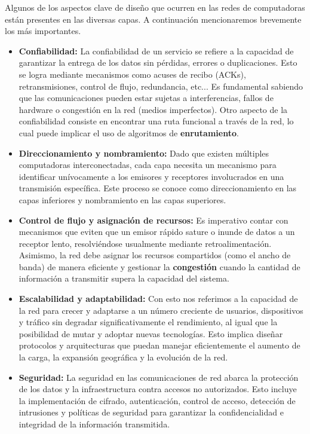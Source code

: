 Algunos de los aspectos clave de diseño que ocurren en las redes de computadoras están presentes en las diversas capas. A continuación mencionaremos brevemente los más importantes.

\begin{itemize}
  \item \textbf{Confiabilidad:} La confiabilidad de un servicio se refiere a la capacidad de garantizar la entrega de los datos sin pérdidas, errores o duplicaciones. Esto se logra mediante mecanismos como acuses de recibo (ACKs), retransmisiones, control de flujo, redundancia, etc... Es fundamental sabiendo que las comunicaciones pueden estar sujetas a interferencias, fallos de hardware o congestión en la red (medios imperfectos). Otro aspecto de la confiabilidad consiste en encontrar una ruta funcional a través de la red, lo cual puede implicar el uso de algoritmos de \textbf{enrutamiento}.
  \item \textbf{Direccionamiento y nombramiento:} Dado que existen múltiples computadoras interconectadas, cada capa necesita un mecanismo para identificar unívocamente a los emisores y receptores involucrados en una transmisión específica. Este proceso se conoce como direccionamiento en las capas inferiores y nombramiento en las capas superiores.
  \item \textbf{Control de flujo y asignación de recursos:} Es imperativo contar con mecanismos que eviten que un emisor rápido sature o inunde de datos a un receptor lento, resolviéndose usualmente mediante retroalimentación. Asimismo, la red debe asignar los recursos compartidos (como el ancho de banda) de manera eficiente y gestionar la \textbf{congestión} cuando la cantidad de información a transmitir supera la capacidad del sistema.
  \item \textbf{Escalabilidad y adaptabilidad:} Con esto nos referimos a la capacidad de la red para crecer y adaptarse a un número creciente de usuarios, dispositivos y tráfico sin degradar significativamente el rendimiento, al igual que la posibilidad de mutar y adoptar nuevas tecnologías. Esto implica diseñar protocolos y arquitecturas que puedan manejar eficientemente el aumento de la carga, la expansión geográfica y la evolución de la red.
  \item \textbf{Seguridad:} La seguridad en las comunicaciones de red abarca la protección de los datos y la infraestructura contra accesos no autorizados. Esto incluye la implementación de cifrado, autenticación, control de acceso, detección de intrusiones y políticas de seguridad para garantizar la confidencialidad e integridad de la información transmitida. 
\end{itemize}

